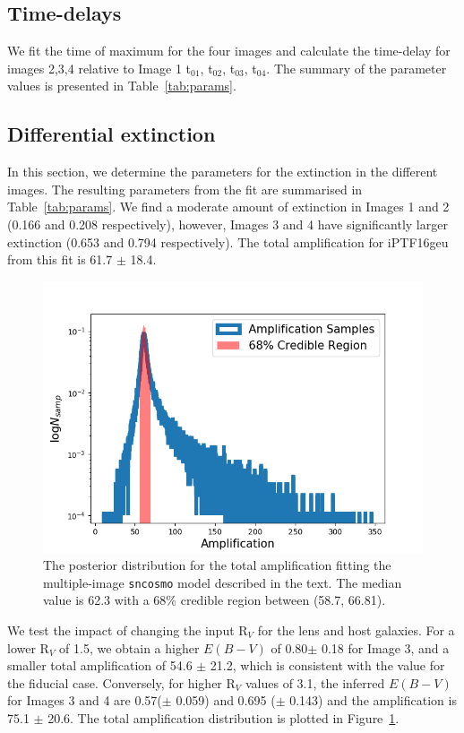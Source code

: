 \documentclass[a4paper,fleqn,usenatbib]{mnras}
\begin{document}




\subsection{Time-delays}
\label{ssec-time_delay}
We fit the time of maximum for the four images and calculate the time-delay for images 2,3,4 relative to Image 1  t$_{01}$, t$_{02}$, t$_{03}$, t$_{04}$. The summary of the parameter values is presented in Table~\ref{tab:params}. 

\subsection{Differential extinction}
\label{ssec-extinction}
In this section, we determine the parameters for the extinction in the different images. The resulting parameters from the fit are summarised in Table~\ref{tab:params}. We find a moderate amount of extinction in Images 1 and 2 (0.166 and 0.208 respectively), however, Images 3 and 4 have significantly larger extinction (0.653 and 0.794 respectively). The total amplification for iPTF16geu from this fit is 61.7 $\pm$ 18.4.

\begin{figure}
    \centering
    \includegraphics[width=.5\textwidth]{amplif_dist_forpaper.png}
    \caption{The posterior distribution for the total amplification fitting the multiple-image \texttt{sncosmo} model described in the text. The median value is 62.3 with a 68$\%$ credible region between (58.7, 66.81).}
    \label{fig:amp}
\end{figure}

We test the impact of changing the input R$_V$ for the lens and host galaxies. For a lower R$_V$ of 1.5, we obtain a higher $E(B-V)$ of 0.80$\pm$ 0.18 for Image 3, and a smaller total amplification of 54.6 $\pm$ 21.2, which is consistent with the value for the fiducial case. Conversely, for higher R$_V$ values of 3.1, the inferred $E(B-V)$ for Images 3 and 4 are 0.57($\pm$ 0.059) and 0.695 ($\pm$ 0.143) and the amplification is 75.1 $\pm$ 20.6. The total amplification distribution is plotted in Figure~\ref{fig:amp}. 
\end{document}
